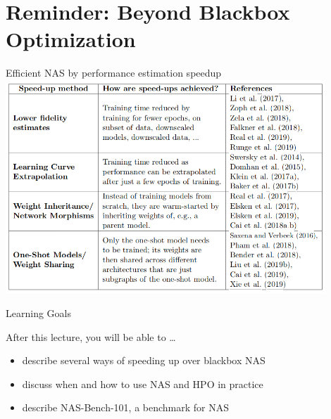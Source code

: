 \section{Reminder: Beyond Blackbox Optimization}
\begin{frame}[c]{Efficient NAS by performance estimation speedup}
\centering
\includegraphics[width=0.9\textwidth]{images_lec7/performance_estimation.png}\\
\end{frame}



\begin{frame}[c]{Learning Goals}

After this lecture, you will be able to \ldots

\begin{itemize}
	\item describe \alert{several ways of speeding up over blackbox NAS}  %
	\item discuss \alert{when and how to use NAS and HPO in practice} 
	\item describe \alert{NAS-Bench-101}, a benchmark for NAS
\end{itemize}

\end{frame}



